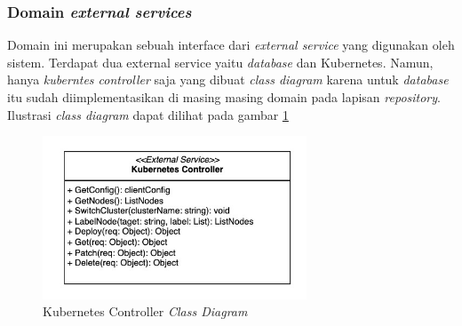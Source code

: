 \pagebreak

\subsubsection{Domain \textit{external services}}

Domain ini merupakan sebuah interface dari \textit{external service} yang digunakan oleh sistem. Terdapat dua external service yaitu \textit{database} dan Kubernetes. Namun, hanya \textit{kuberntes controller} saja yang dibuat \textit{class diagram} karena untuk \textit{database} itu sudah diimplementasikan di masing masing domain pada lapisan \textit{repository}. Ilustrasi \textit{class diagram} dapat dilihat pada gambar \ref{fig:kubernetes-controller-class-diagram}

\begin{figure}[ht]
  \centering
  \includegraphics[width=0.7\textwidth]{resources/chapter-3/class/kubernetes-controller}
  \caption{Kubernetes Controller \textit{Class Diagram}}
  \label{fig:kubernetes-controller-class-diagram}
\end{figure}